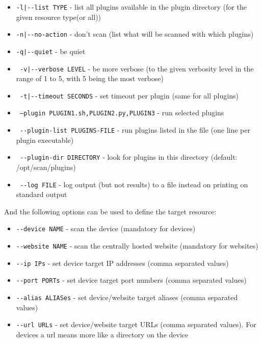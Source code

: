 \begin{itemize}

\item 

    \texttt{-l|-{}-list TYPE} - list all plugins available in the plugin directory 
                       (for the given resource type(or all))
\item                  
    \texttt{-n|-{}-no-action} - don't scan    			     (list what will be scanned with which plugins)
\item    \texttt{-q|-{}-quiet} - be quiet
\item    \texttt{    -v|-{}-verbose LEVEL} - be more verbose 
    	 				 (to the given verbosity level in the range of 1 to 5,
    	 				  with 5 being the most verbose)
\item    \texttt{    -t|-{}-timeout SECONDS} - set timeout per plugin (same for all plugins)
\item    \texttt{    --plugin PLUGIN1.sh,PLUGIN2.py,PLUGIN3} - run selected plugins
\item    \texttt{ -{}-plugin-list PLUGINS-FILE} - run plugins listed in the file (one line per plugin executable)
\item    \texttt{  -{}-plugin-dir DIRECTORY} - look for plugins in this directory (default: /opt/scan/plugins)
\item    \texttt{    -{}-log FILE} - log output (but not results) to a file instead on printing on standard output  

\end{itemize}
And the following options can be used to define the target resource:
\begin{itemize}

    \item    \texttt{-{}-device NAME} - scan the device (mandatory for devices)
    \item    \texttt{-{}-website NAME} - scan the centrally hosted website (mandatory for websites)
    \item    \texttt{-{}-ip IPs} - set device target IP addresses (comma separated values)
    \item    \texttt{-{}-port PORTs} - set device target port numbers (comma separated values)
    \item    \texttt{-{}-alias ALIASes} - set device/website target aliases (comma separated values)
    \item    \texttt{-{}-url URLs} - set device/website target URLs (comma separated values). For devices a url means more like a directory on the device 
   \end{itemize}
   


